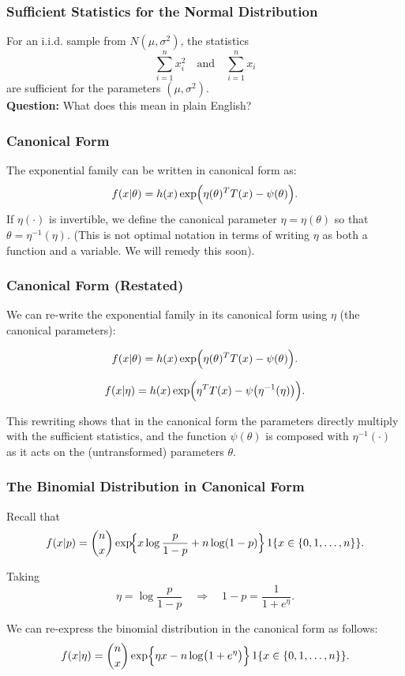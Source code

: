\documentclass{beamer}
\begin{document}
\begin{frame}
\frametitle{Sufficient Statistics for the Normal Distribution}
For an i.i.d. sample from $N(\mu,\sigma^2)$, the statistics
\[
\sum_{i=1}^n x_i^2 \quad \text{and} \quad \sum_{i=1}^n x_i
\]
are sufficient for the parameters $(\mu,\sigma^2)$.\\[1em]
\textbf{Question:} What does this mean in plain English?
\end{frame}

\begin{frame}
\frametitle{Canonical Form}
The exponential family can be written in canonical form as:
\[
f(x|\theta) = h(x)\exp\Bigl(\eta(\theta)^T T(x) - \psi(\theta)\Bigr).
\]
If $\eta(\cdot)$ is invertible, we define the canonical parameter $\eta = \eta(\theta)$ so that $\theta = \eta^{-1}(\eta)$. (This is not optimal notation in terms of writing $\eta$ as both a function and a variable. We will remedy this soon). 

\end{frame}

\begin{frame}
\frametitle{Canonical Form (Restated)}

We can re-write the exponential family in its canonical form using $\eta$ (the canonical parameters):

\[
f(x|\theta) = h(x)\exp\Bigl(\eta(\theta)^T T(x) - \psi(\theta)\Bigr).
\]

\[
f(x|\eta) = h(x)\exp\Bigl(\eta^T T(x) - \psi\bigl(\eta^{-1}(\eta)\bigr)\Bigr).
\]


This rewriting shows that in the canonical form the parameters directly multiply with the sufficient statistics, and the function $\psi(\theta)$ is composed with $\eta^{-1}(\cdot)$ as it acts on the (untransformed) parameters $\theta$.
\end{frame}

\begin{frame}
\frametitle{The Binomial Distribution in Canonical Form}
Recall that
\[
f(x|p) = \binom{n}{x}\exp\!\Bigl\{x\log\frac{p}{1-p}+n\log(1-p)\Bigr\}\, 1\{x \in \{0,1,\dots,n\}\}.
\]

Taking 
\[
\eta = \log\frac{p}{1-p} \quad \Longrightarrow \quad 1-p = \frac{1}{1+e^\eta}.
\]

We can re-express the binomial distribution in the canonical form as follows:
\[
f(x|\eta) = \binom{n}{x}\exp\Bigl\{\eta x - n\log\bigl(1+e^\eta\bigr)\Bigr\}\, 1\{x \in \{0,1,\dots,n\}\}.
\]
\end{frame}
\end{document}
